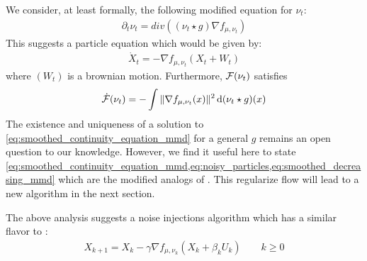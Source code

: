 We consider, at least formally, the following modified equation for $\nu_t$:
\begin{align}\label{eq:smoothed_continuity_equation_mmd}
\partial_t \nu_t = div((\nu_t \star g) \nabla f_{\mu,\nu_t} )
\end{align}
This suggests a particle equation which would be given by:
\begin{align}\label{eq:noisy_particles}
\dot{X}_t = -\nabla f_{\mu,\nu_t}( X_t + W_t  )
\end{align}
where $(W_t)$ is a brownian motion. Furthermore, ${{\mathcal F}}(\nu_t)$ satisfies
\begin{align}\label{eq:smoothed_decreasing_mmd}
\dot{{{\mathcal F}}}(\nu_t) = -\int \Vert \nabla f_{\mu,\nu_t}(x)\Vert^2 \mathop{}\!\mathrm{d} (\nu_t\star g)(x)
\end{align}
The existence and uniqueness of a solution to \cref{eq:smoothed_continuity_equation_mmd} for a general $g$ remains an open question to our knowledge. However, we find it useful here to state \cref{eq:smoothed_continuity_equation_mmd,eq:noisy_particles,eq:smoothed_decreasing_mmd} which are the modified analogs of . This regularize flow will lead to a new algorithm in the next section.



The above analysis suggests a noise injections algorithm which has a similar flavor to :
\begin{align}\label{eq:discretized_noisy_flow}
	X_{k+1} = X_{k} -\gamma \nabla f_{\mu,\nu_k}(X_k+ \beta_k U_k) \qquad k\geq 0
\end{align}

